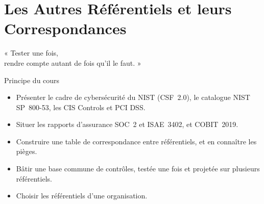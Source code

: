 
\chapter{Les Autres Référentiels et leurs Correspondances}
\label{chap:referentiels}

\epigraph{%
    « Tester une fois,\\
    rendre compte autant de fois qu'il le faut. »%
}{Principe du cours}


\begin{boxobjectifs}
\begin{itemize}
    \item Présenter le cadre de cybersécurité du NIST (CSF~2.0), le
          catalogue NIST SP~800-53, les CIS Controls et PCI DSS.
    \item Situer les rapports d'assurance SOC~2 et ISAE~3402, et COBIT~2019.
    \item Construire une table de correspondance entre référentiels, et en
          connaître les pièges.
    \item Bâtir une base commune de contrôles, testée une fois et projetée
          sur plusieurs référentiels.
    \item Choisir les référentiels d'une organisation.
\end{itemize}
\end{boxobjectifs}

